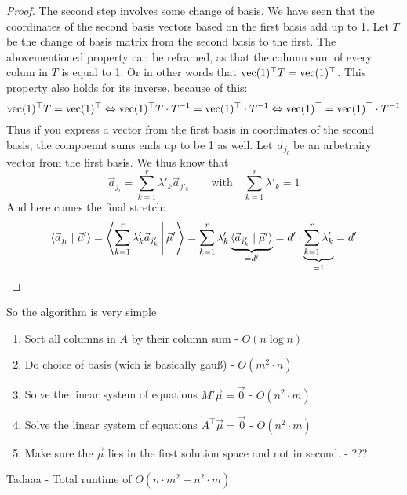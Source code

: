 \begin{proof}
    The second step involves some change of basis. We have seen that the coordinates of the second basis vectors based on the first basis add up to 1. Let $T$ be the change of basis matrix from the second basis to the first. The abovementioned property can be reframed, as that the column sum of every colum in $T$ is equal to 1. Or in other words that $\operatorname{vec}(1)^\top T = \operatorname{vec}(1)^\top$. This property also holds for its inverse, because of this:
    $$\operatorname{vec}(1)^\top T = \operatorname{vec}(1)^\top \Leftrightarrow \operatorname{vec}(1)^\top T\cdot T^{-1} = \operatorname{vec}(1)^\top\cdot T^{-1} \Leftrightarrow \operatorname{vec}(1)^\top = \operatorname{vec}(1)^\top\cdot T^{-1}$$
    Thus if you express a vector from the first basis in coordinates of the second basis, the compoennt sums ends up to be 1 as well. Let $\vec a_{j_l}$ be an arbetrairy vector from the first basis. We thus know that
    $$\vec a_{j_l} = \sum_{k=1}^{r}\lambda'_k \vec a_{j'_k} \qquad \textrm{with}\quad \sum_{k=1}^{r}\lambda'_k = 1$$
    And here comes the final stretch:
    $$\langle \vec a_{j_l} \mid \vec\mu' \rangle = \left\langle \sum_{k=1}^{r}\lambda'_k \vec a_{j'_k} \,\middle|\, \vec\mu' \right\rangle = \sum_{k=1}^{r} \lambda'_k \underbrace{\langle \vec a_{j'_k} \mid \vec\mu' \rangle}_{=d'} = d' \cdot \underbrace{\sum_{k=1}^{r} \lambda'_k}_{=1} = d'$$
\end{proof}

So the algorithm is very simple
\begin{enumerate}
    \item Sort all columns in $A$ by their column sum - $O(n \log n)$
    \item Do choice of basis (wich is basically gauß) - $O(m^2 \cdot n)$
    \item Solve the linear system of equations $M'\vec\mu=\vec0$ - $O(n^2 \cdot m)$
    \item Solve the linear system of equations $A^\top\vec\mu=\vec0$ - $O(n^2 \cdot m)$
    \item Make sure the $\vec\mu$ lies in the first solution space and not in second. - ???
\end{enumerate}
Tadaaa - Total runtime of $O(n \cdot m^2 + n^2 \cdot m )$